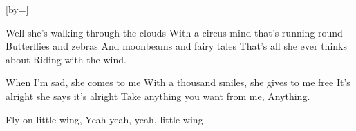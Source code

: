 

[by=]

\begin{LARGE}


\beginverse
Well she's walking through the clouds
With a circus mind that's running round
Butterflies and zebras
And moonbeams and fairy tales
That's all she ever thinks about
Riding with the wind.
\endverse

\beginverse
When I'm sad, she comes to me
With a thousand smiles, she gives to me free
It's alright she says it's alright
Take anything you want from me,
Anything.
\endverse

\beginverse
Fly on little wing,
Yeah yeah, yeah, little wing
\endverse


\end{LARGE}

\chordson
\endsong
